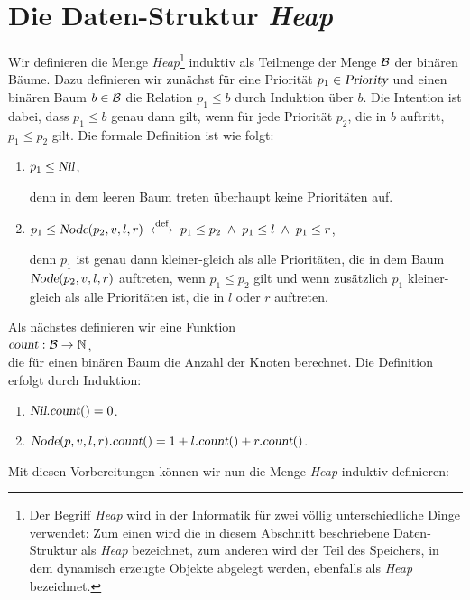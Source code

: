 \section[Heaps]{Die Daten-Struktur \emph{Heap}}
Wir definieren die Menge \textsl{Heap}\footnote{
Der Begriff \textsl{Heap} wird in der Informatik f\"ur zwei v\"ollig unterschiedliche Dinge
verwendet:  Zum einen wird die in diesem Abschnitt beschriebene Daten-Struktur als
\textsl{Heap} bezeichnet, zum anderen wird der Teil des Speichers, in dem dynamisch
erzeugte Objekte abgelegt werden, ebenfalls als \textsl{Heap} bezeichnet.}
induktiv als Teilmenge der Menge $\mathcal{B}$ der
bin\"aren B\"aume. Dazu definieren wir zun\"achst f\"ur eine Priorit\"at $p_1\in \textsl{Priority}$ und
einen bin\"aren Baum $b \in \mathcal{B}$ die Relation $p_1 \leq b$ durch Induktion \"uber $b$.
Die Intention ist dabei, dass $p_1 \leq b$ genau dann gilt, wenn f\"ur jede Priorit\"at $p_2$,
die in $b$ auftritt,  $p_1 \leq p_2$ gilt. Die formale Definition ist wie folgt:
\begin{enumerate}
\item $p_1 \leq \textsl{Nil}$,

      denn in dem leeren Baum treten \"uberhaupt keine Priorit\"aten auf.
\item $p_1 \leq \textsl{Node}(p_2,v,l,r) \;\stackrel{\mbox{\scriptsize def}}{\longleftrightarrow}\; p_1 \leq p_2 \;\wedge\; p_1 \leq l \;\wedge\; p_1 \leq r$,
         
      denn $p_1$ ist genau dann kleiner-gleich als alle Priorit\"aten, die in dem Baum 
      $\textsl{Node}(p_2,v,l,r)$ auftreten, wenn $p_1 \leq p_2$ gilt und wenn zus\"atzlich
      $p_1$ kleiner-gleich als alle Priorit\"aten ist, die in $l$ oder $r$ auftreten.
\end{enumerate}
Als n\"achstes definieren wir eine Funktion \\[0.1cm]
\hspace*{1.3cm} $\textsl{count}: \mathcal{B} \rightarrow \mathbb{N}$, \\[0.1cm]
die f\"ur einen bin\"aren Baum die Anzahl der Knoten berechnet.  Die Definition erfolgt durch
Induktion:
\begin{enumerate}
\item $\textsl{Nil}.\textsl{count}() = 0$.
\item $\textsl{Node}(p,v,l,r).\textsl{count}() = 1 + l.\textsl{count}() + r.\textsl{count}()$.
\end{enumerate}
Mit diesen Vorbereitungen k\"onnen wir nun die Menge \textsl{Heap} induktiv definieren:
